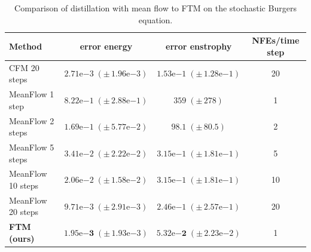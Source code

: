 \documentclass[oneside,11pt]{article}
\theoremstyle{remark}
\begin{document}
\begin{table}
\centering\small
\caption{Comparison of distillation with mean flow to FTM on the stochastic Burgers equation.}
\label{tab:meanflowext}
\begin{tabular}{lccc}
\toprule
\textbf{Method} & error energy & error enstrophy & NFEs/time step \\
\midrule
CFM 20 steps \cite{albergo-vanden-eijnden:2022,lipman2023flow} & $2.71\mathrm{e}{-3}\;(\pm\,1.96\mathrm{e}{-3})$ 
& $1.53\mathrm{e}{-1}\;(\pm\,1.28\mathrm{e}{-1})$ 
& 20 \\
MeanFlow 1 step\cite{geng2025mean} & $8.22\mathrm{e}{-1}\;(\pm\,2.88\mathrm{e}{-1})$ 
& $359\;(\pm\,278)$ 
& 1 \\
MeanFlow 2 steps \cite{geng2025mean} & $1.69\mathrm{e}{-1}\;(\pm\,5.77\mathrm{e}{-2})$ 
& $98.1\;(\pm\,80.5)$ 
& 2 \\
MeanFlow 5 steps \cite{geng2025mean} & $3.41\mathrm{e}{-2}\;(\pm\,2.22\mathrm{e}{-2})$ 
& $3.15\mathrm{e}{-1}\;(\pm\,1.81\mathrm{e}{-1})$ 
& 5 \\
MeanFlow 10 steps\cite{geng2025mean} & $2.06\mathrm{e}{-2}\;(\pm\,1.58\mathrm{e}{-2})$ 
& $3.15\mathrm{e}{-1}\;(\pm\,1.81\mathrm{e}{-1})$ 
& 10 \\
MeanFlow 20 steps \cite{geng2025mean} & $9.71\mathrm{e}{-3}\;(\pm\,2.91\mathrm{e}{-3})$ 
& $2.46\mathrm{e}{-1}\;(\pm\,2.57\mathrm{e}{-1})$ 
& 20 \\
\textbf{FTM (ours)} 
& $\mathbf{1.95\mathrm{e}{-3}}\;(\pm\,1.93\mathrm{e}{-3})$ 
& $\mathbf{5.32\mathrm{e}{-2}}\;(\pm\,2.23\mathrm{e}{-2})$ 
& 1 \\







































\bottomrule
\end{tabular}
\end{table}
\end{document}
